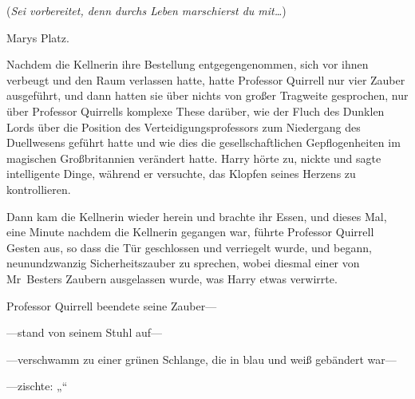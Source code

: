 (\emph{Sei vorbereitet, denn durchs Leben marschierst du mit…})

Marys Platz.

Nachdem die Kellnerin ihre Bestellung entgegengenommen, sich vor ihnen verbeugt und den Raum verlassen hatte, hatte Professor Quirrell nur vier Zauber ausgeführt, und dann hatten sie über nichts von großer Tragweite gesprochen, nur über Professor Quirrells komplexe These darüber, wie der Fluch des Dunklen Lords über die Position des Verteidigungsprofessors zum Niedergang des Duellwesens geführt hatte und wie dies die gesellschaftlichen Gepflogenheiten im magischen Großbritannien verändert hatte. Harry hörte zu, nickte und sagte intelligente Dinge, während er versuchte, das Klopfen seines Herzens zu kontrollieren.

Dann kam die Kellnerin wieder herein und brachte ihr Essen, und dieses Mal, eine Minute nachdem die Kellnerin gegangen war, führte Professor Quirrell Gesten aus, so dass die Tür geschlossen und verriegelt wurde, und begann, neunundzwanzig Sicherheitszauber zu sprechen, wobei diesmal einer von Mr~Besters Zaubern ausgelassen wurde, was Harry etwas verwirrte.

Professor Quirrell beendete seine Zauber—

—stand von seinem Stuhl auf—

—verschwamm zu einer grünen Schlange, die in blau und weiß gebändert war—

—zischte: „“

